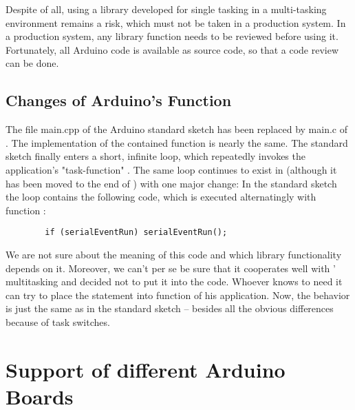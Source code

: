 Despite of all, using a library developed for single tasking in a
multi-tasking environment remains a risk, which must not be taken in a
production system. In a production system, any library function needs to
be reviewed before using it. Fortunately, all Arduino code is available as
source code, so that a code review can be done.



\subsection{Changes of Arduino's  Function}

The file main.cpp of the Arduino standard sketch has been replaced by
main.c of \rtos. The implementation of the contained function 
is nearly the same. The standard sketch finally enters a short, infinite
loop, which repeatedly invokes the application's "task-function"
. The same loop continues to exist in \rtos{} (although it has
been moved to the end of ) with one major change: In
the standard sketch the loop contains the following code, which is
executed alternatingly with function :
\begin{verbatim}
		if (serialEventRun) serialEventRun();
\end{verbatim}
We are not sure about the meaning of this code and which library
functionality depends on it. Moreover, we can't per se be sure that it
cooperates well with \rtos{}' multitasking and decided not to put it into
the \rtos{} code. Whoever knows to need it can try to place the statement
into function  of his \rtos{} application. Now, the behavior
is just the same as in the standard sketch -- besides all the obvious
differences because of task switches.


\section{Support of different Arduino Boards}
\label{secArduinoBoards}

